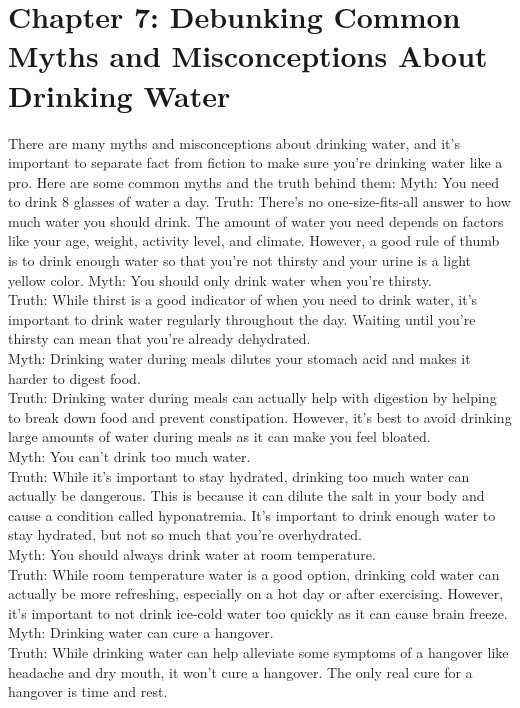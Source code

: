 \chapter{Chapter 7: Debunking Common Myths and Misconceptions About Drinking Water
}

There are many myths and misconceptions about drinking water, and it's important to separate fact from fiction to make sure you're drinking water like a pro. Here are some common myths and the truth behind them:
Myth: You need to drink 8 glasses of water a day.
Truth: There's no one-size-fits-all answer to how much water you should drink. The amount of water you need depends on factors like your age, weight, activity level, and climate. However, a good rule of thumb is to drink enough water so that you're not thirsty and your urine is a light yellow color.\newline \newline
Myth: You should only drink water when you're thirsty. \\
Truth: While thirst is a good indicator of when you need to drink water, it's important to drink water regularly throughout the day. Waiting until you're thirsty can mean that you're already dehydrated.\\
Myth: Drinking water during meals dilutes your stomach acid and makes it harder to digest food.\\
Truth: Drinking water during meals can actually help with digestion by helping to break down food and prevent constipation. However, it's best to avoid drinking large amounts of water during meals as it can make you feel bloated.\\
Myth: You can't drink too much water.\\
Truth: While it's important to stay hydrated, drinking too much water can actually be dangerous. This is because it can dilute the salt in your body and cause a condition called hyponatremia. It's important to drink enough water to stay hydrated, but not so much that you're overhydrated.\\
Myth: You should always drink water at room temperature.\\
Truth: While room temperature water is a good option, drinking cold water can actually be more refreshing, especially on a hot day or after exercising. However, it's important to not drink ice-cold water too quickly as it can cause brain freeze.\\
Myth: Drinking water can cure a hangover.\\
Truth: While drinking water can help alleviate some symptoms of a hangover like headache and dry mouth, it won't cure a hangover. The only real cure for a hangover is time and rest.\\

